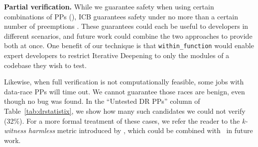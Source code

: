 


{\bf Partial verification.}
While we guarantee safety when using certain combinations of PPs (\sect{\ref{sec:eval-sssmc}}),
ICB
guarantees safety under no more than a certain number of preemptions \cite{chess-icb}.
These guarantees could each be useful to developers in different scenarios,
and future work could combine the two approaches to provide both at once.
One benefit of our technique is that {\tt within\_function} %
would enable expert developers to
restrict Iterative Deepening to only the modules of a codebase they wish to test.

Likewise, when full verification is not computationally feasible,
some jobs with data-race PPs will time out.
We cannot guarantee those races are
benign, even though no bug was found.
In the ``Untested DR PPs'' column of Table~\ref{tab:drstatistix}, we show how many such candidates we could not verify (32\%).
For a more formal treatment of these cases, we refer the reader to the {\em k-witness harmless} metric introduced by \cite{portend},
which could be combined with \quicksand~in future work.
